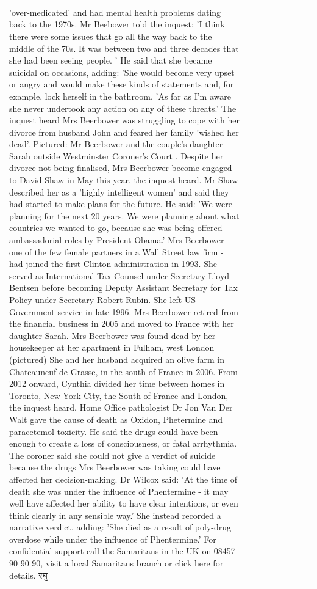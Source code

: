 \begin{table}[H]
\begin{tabular}{lllrlllll}
'over-medicated' and had mental health problems dating back to the 1970s. Mr Beebower told the inquest: 'I think there were some issues that go all the way back to the middle of the 70s. It was between two and three decades that she had been seeing people. ' He said that she became suicidal on occasions, adding: 'She would become very upset or angry and would make these kinds of statements and, for example, lock herself in the bathroom. 'As far as I'm aware she never undertook any action on any of these threats.' The inquest heard Mrs Beerbower was struggling to cope with her divorce from husband John and feared her family 'wished her dead'. Pictured: Mr Beerbower and the couple's daughter Sarah outside Westminster Coroner's Court . Despite her divorce not being finalised, Mrs Beerbower become engaged to David Shaw in May this year, the inquest heard. Mr Shaw described her as a 'highly intelligent women' and said they had started to make plans for the future. He said: 'We were planning for the next 20 years. We were planning about what countries we wanted to go, because she was being offered ambassadorial roles by President Obama.' Mrs Beerbower - one of the few female partners in a Wall Street law firm - had joined the first Clinton administration in 1993. She served as International Tax Counsel under Secretary Lloyd Bentsen before becoming Deputy Assistant Secretary for Tax Policy under Secretary Robert Rubin. She left US Government service in late 1996. Mrs Beerbower retired from the financial business in 2005 and moved to France with her daughter Sarah. Mrs Beerbower was found dead by her housekeeper at her apartment in Fulham, west London (pictured) She and her husband acquired an olive farm in Chateauneuf de Grasse, in the south of France in 2006. From 2012 onward, Cynthia divided her time between homes in Toronto, New York City, the South of France and London, the inquest heard. Home Office pathologist Dr Jon Van Der Walt gave the cause of death as Oxidon, Phetermine and paracetemol toxicity. He said the drugs could have been enough to create a loss of consciousness, or fatal arrhythmia. The coroner said she could not give a verdict of suicide because the drugs Mrs Beerbower was taking could have affected her decision-making. Dr Wilcox said: 'At the time of death she was under the influence of Phentermine - it may well have affected her ability to have clear intentions, or even think clearly in any sensible way.' She instead recorded a narrative verdict, adding: 'She died as a result of poly-drug overdose while under the influence of Phentermine.' For confidential support call the Samaritans in the UK on 08457 90 90 90, visit a local Samaritans branch or click here for details. रघु \\

\end{tabular}
\end{table}
